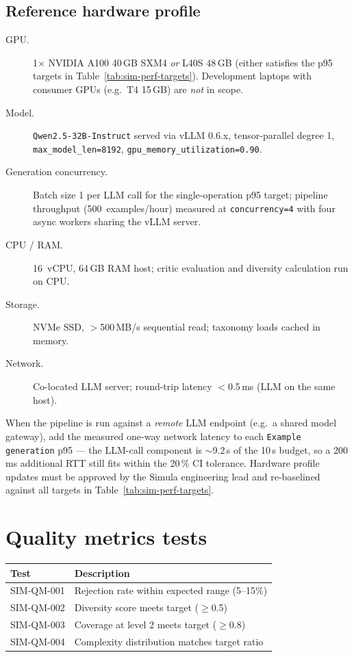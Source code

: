 \subsection{Reference hardware profile}
\label{sec:sim-perf-hardware}

\begin{description}
  \item[GPU.] 1$\times$ NVIDIA A100 40\,GB SXM4 \emph{or} L40S 48\,GB
        (either satisfies the p95 targets in
        Table~\ref{tab:sim-perf-targets}). Development laptops with
        consumer GPUs (e.g.\ T4 15\,GB) are \emph{not} in scope.
  \item[Model.] \texttt{Qwen2.5-32B-Instruct} served via vLLM 0.6.x,
        tensor-parallel degree 1, \texttt{max\_model\_len=8192},
        \texttt{gpu\_memory\_utilization=0.90}.
  \item[Generation concurrency.] Batch size 1 per LLM call for the
        single-operation p95 target; pipeline throughput
        (500~examples/hour) measured at \texttt{concurrency=4} with
        four async workers sharing the vLLM server.
  \item[CPU / RAM.] 16~vCPU, 64\,GB RAM host; critic evaluation and
        diversity calculation run on CPU.
  \item[Storage.] NVMe SSD, $>$500\,MB/s sequential read; taxonomy
        loads cached in memory.
  \item[Network.] Co-located LLM server; round-trip latency
        $<$0.5\,ms (LLM on the same host).
\end{description}

\noindent
When the pipeline is run against a \emph{remote} LLM endpoint (e.g.\ a
shared model gateway), add the measured one-way network latency to each
\texttt{Example generation} p95 --- the LLM-call component is
$\sim$9.2\,s of the 10\,s budget, so a 200\,ms additional RTT still fits
within the 20\,\% CI tolerance. Hardware profile updates must be
approved by the Simula engineering lead and re-baselined against all
targets in Table~\ref{tab:sim-perf-targets}.

\section{Quality metrics tests}

\begin{tabularx}{\linewidth}{@{}l X@{}}
\toprule
\textbf{Test} & \textbf{Description} \\ \midrule
SIM-QM-001 & Rejection rate within expected range (5--15\%) \\
SIM-QM-002 & Diversity score meets target ($\geq$0.5) \\
SIM-QM-003 & Coverage at level 2 meets target ($\geq$0.8) \\
SIM-QM-004 & Complexity distribution matches target ratio \\
\bottomrule
\end{tabularx}

